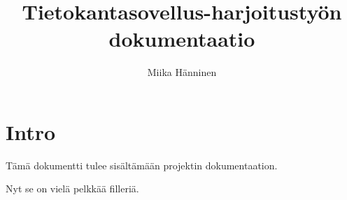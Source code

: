 \documentclass[a4paper]{article}
\title{Tietokantasovellus-harjoitustyön dokumentaatio}
\author{Miika Hänninen}
\begin{document}
\maketitle
\tableofcontents
\section{Intro}
Tämä dokumentti tulee sisältämään projektin dokumentaation.

Nyt se on vielä pelkkää filleriä.
\end{document}
